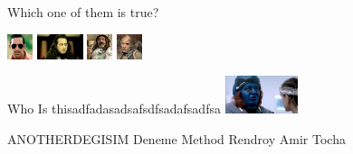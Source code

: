 \documentclass{exam}
\begin{document}
\begin{questions}
\question Which one of them is true?\newline
\begin{oneparchoices}
\choice \includegraphics[height=2em]{arifisik.jpg}
\choice \includegraphics[height=2em]{komutanlogar.jpeg}
\choice \includegraphics[height=2em]{faruk.jpg}
\choice \includegraphics[height=2em]{216.jpg}
\end{oneparchoices}
\question Who Is thisadfadasadsafsdfsadafsadfsa\newline
\includegraphics[height=3em]{rendroy2.jpg} \newline
\begin{oneparchoices}
\choice ANOTHERDEGISIM
\choice Deneme Method
\choice Rendroy
\choice Amir Tocha
\end{oneparchoices}
\end{questions}
\end{document}
